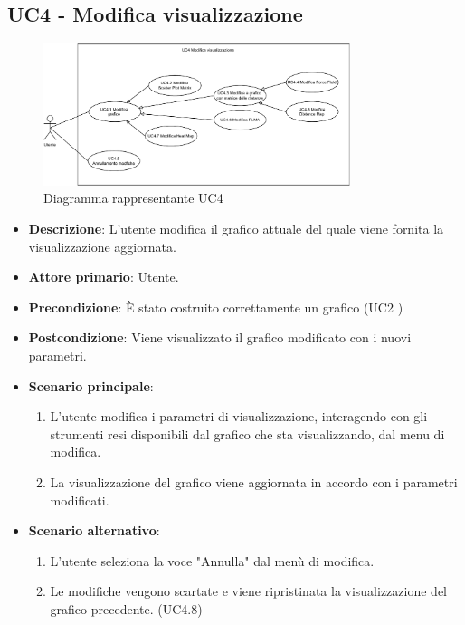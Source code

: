\newpage
\subsection{UC4 - Modifica visualizzazione}
\label{sub:uc4}

\begin{figure}[h]
    \centering
    \includegraphics[width=0.8\textwidth]{componenti/casi-duso/diagrammi/UC4.pdf}
    \caption{Diagramma rappresentante UC4}
    \label{fig:UC4}
\end{figure}


\begin{itemize}
    \item \textbf{Descrizione}: L’utente modifica il grafico attuale del quale viene fornita la visualizzazione aggiornata.
	
    \item \textbf{Attore primario}: Utente.
    
    \item \textbf{Precondizione}:   È stato costruito correttamente un grafico (UC2 )

    \item \textbf{Postcondizione}:  Viene visualizzato il grafico modificato con i nuovi parametri.

	\item \textbf{Scenario principale}:
		\begin{enumerate}
            \item L'utente modifica i parametri di visualizzazione, interagendo con gli strumenti resi disponibili dal grafico che sta visualizzando,
                    dal menu di modifica.
            \item La visualizzazione del grafico viene aggiornata in accordo con i parametri modificati.
        \end{enumerate}

    \item \textbf{Scenario alternativo}:
        \begin{enumerate}
            \item L'utente seleziona la voce "Annulla" dal menù di modifica.
            \item Le modifiche vengono scartate e viene ripristinata la visualizzazione del grafico precedente.  (UC4.8)
        \end{enumerate}
    
\end{itemize}

